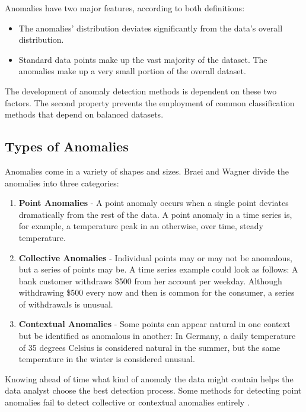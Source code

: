 Anomalies have two major features, according to both definitions:

\begin{itemize}
	\item The anomalies' distribution deviates significantly from the data's overall distribution.
	\item Standard data points make up the vast majority of the dataset. The anomalies make up a very small portion of the overall dataset.
\end{itemize}

The development of anomaly detection methods is dependent on these two factors. The second property prevents the employment of common classification methods that depend on balanced datasets.

\subsection{Types of Anomalies}
Anomalies come in a variety of shapes and sizes. Braei and Wagner \parencite*{Braei2020}  divide the anomalies into three categories:

\begin{enumerate}
	\item \textbf{Point Anomalies} - A point anomaly occurs when a single point deviates dramatically from the rest of the data.
	A point anomaly in a time series is, for example, a temperature peak in an otherwise, over time, steady temperature.
	\item \textbf{Collective Anomalies} - Individual points may or may not be anomalous, but a series of points may be. A time series example could look as follows: A bank customer withdraws \$500 from her account per weekday. Although withdrawing \$500 every now and then is common for the consumer, a series of withdrawals is unusual.
	\item \textbf{Contextual Anomalies} - Some points can appear natural in one context but be identified as anomalous in another: In Germany, a daily temperature of 35 degrees Celsius is considered natural in the summer, but the same temperature in the winter is considered unusual.
\end{enumerate}

Knowing ahead of time what kind of anomaly the data might contain helps the data analyst choose the best detection process. Some methods for detecting point anomalies fail to detect collective or contextual anomalies entirely \parencite{Braei2020}. 

